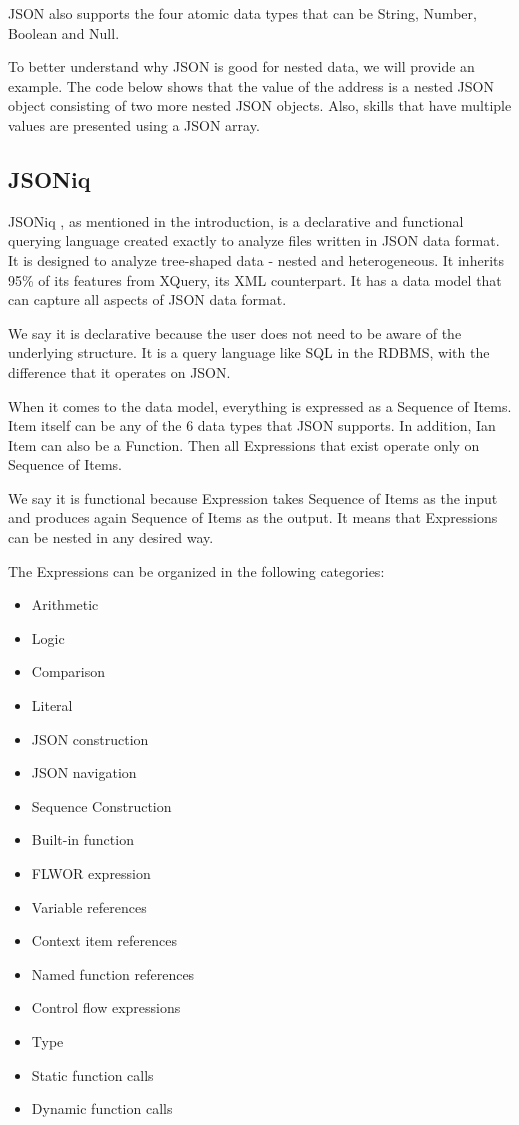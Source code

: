 JSON also supports the four atomic data types that can be String, Number, Boolean and Null.

To better understand why JSON is good for nested data, we will provide an example. The code below shows that the value of the address is a nested JSON object consisting of two more nested JSON objects. Also, skills that have multiple values are presented using a JSON array.



\subsection{JSONiq}
\label{sec:JSONiq}
JSONiq \cite{JSONiqPaper}, as mentioned in the introduction, is a declarative and functional querying language created exactly to analyze files written in JSON data format. It is designed to analyze tree-shaped data - nested and heterogeneous. It inherits 95\% of its features from XQuery, its XML counterpart. It has a data model that can capture all aspects of JSON data format. 

We say it is declarative because the user does not need to be aware of the underlying structure. It is a query language like SQL in the RDBMS, with the difference that it operates on JSON.

When it comes to the data model, everything is expressed as a Sequence of Items. Item itself can be any of the 6 data types that JSON supports. In addition, Ian Item can also be a Function. Then all Expressions that exist operate only on Sequence of Items. 

We say it is functional because Expression takes Sequence of Items as the input and produces again Sequence of Items as the output. It means that Expressions can be nested in any desired way.

The Expressions can be organized in the following categories:
\begin{multicols}{2}
	\begin{itemize}
		\item Arithmetic
		\item Logic
		\item Comparison
		\item Literal
		\item JSON construction
		\item JSON navigation
		\item Sequence Construction
		\item Built-in function
		\item FLWOR expression
		\item Variable references
		\item Context item references
		\item Named function references
		\item Control flow expressions
		\item Type 
		\item Static function calls
		\item Dynamic function calls
	\end{itemize}
\end{multicols}

